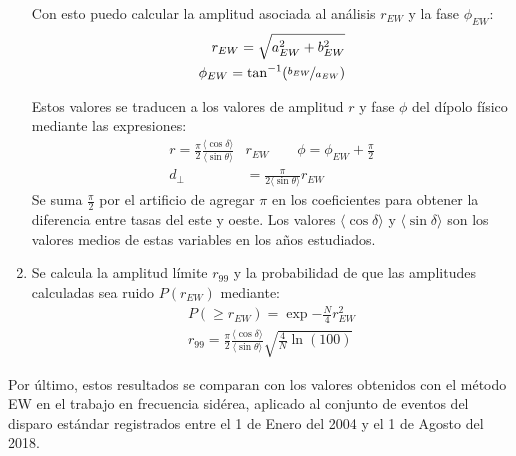 \begin{enumerate}
    Con esto puedo calcular la amplitud asociada al análisis $r_{EW}$ y la fase $\phi_{EW}$:
    \begin{align*}
        r_{EW} = \sqrt{a_{EW}^2 + b_{EW}^2}\\
        \phi_{EW} = \tan^{-1}(\nicefrac{b_{EW}}{a_{EW}})
    \end{align*}

    Estos valores se traducen a los valores de amplitud $r$ y fase $\phi$ del dípolo físico mediante las expresiones:
    \begin{align*}
        r = \frac{\pi}{2} \frac{\langle\cos\delta \rangle}{\langle\sin\theta \rangle} &r_{EW} \qquad
        \phi = \phi_{EW} + \frac{\pi}{2}\\
        d_\perp&= \frac{\pi}{2 \langle\sin\theta \rangle} r_{EW}
    \end{align*}
    Se suma $\frac{\pi}{2}$ por el  artificio de agregar $\pi$ en los coeficientes para obtener la diferencia entre tasas del este y oeste. Los valores $\langle\cos\delta \rangle$ y $\langle\sin\delta \rangle$ son los valores medios de estas variables en los años estudiados. 

    \item Se calcula la amplitud límite $r_{99}$ y la probabilidad de que las amplitudes calculadas sea ruido  $P(r_{EW})$ mediante:
    \begin{align*}
        P(\geq r_{EW}) = \exp{-\frac{N}{4}r^2_{EW}}\\
        r_{99} = \frac{\pi}{2} \frac{\langle\cos\delta \rangle}{\langle\sin\theta \rangle}\sqrt{\frac{4}{N}\ln(100)}
    \end{align*}

\end{enumerate}



Por último, estos resultados se comparan con los valores obtenidos con el método EW en el trabajo \cite{Aab_2020} en frecuencia sidérea, aplicado al conjunto de eventos del disparo estándar registrados entre el 1 de Enero del 2004 y el 1 de Agosto del 2018. 


